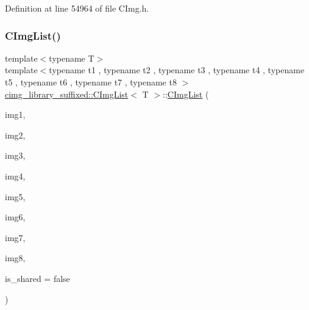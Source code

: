 Definition at line 54964 of file C\+Img.\+h.

\mbox{\label{structcimg__library__suffixed_1_1CImgList_a36b738a02037537b70dc5b18bc13705c}} 
\subsubsection{\texorpdfstring{C\+Img\+List()}{CImgList()}\hspace{0.1cm}{\footnotesize\ttfamily [15/19]}}
{\footnotesize\ttfamily template$<$typename T$>$ \\
template$<$typename t1 , typename t2 , typename t3 , typename t4 , typename t5 , typename t6 , typename t7 , typename t8 $>$ \\
\hyperlink{structcimg__library__suffixed_1_1CImgList}{cimg\+\_\+library\+\_\+suffixed\+::\+C\+Img\+List}$<$ T $>$\+::\hyperlink{structcimg__library__suffixed_1_1CImgList}{C\+Img\+List} (\begin{DoxyParamCaption}\item[{const \hyperlink{structcimg__library__suffixed_1_1CImg}{C\+Img}$<$ t1 $>$ \&}]{img1,  }\item[{const \hyperlink{structcimg__library__suffixed_1_1CImg}{C\+Img}$<$ t2 $>$ \&}]{img2,  }\item[{const \hyperlink{structcimg__library__suffixed_1_1CImg}{C\+Img}$<$ t3 $>$ \&}]{img3,  }\item[{const \hyperlink{structcimg__library__suffixed_1_1CImg}{C\+Img}$<$ t4 $>$ \&}]{img4,  }\item[{const \hyperlink{structcimg__library__suffixed_1_1CImg}{C\+Img}$<$ t5 $>$ \&}]{img5,  }\item[{const \hyperlink{structcimg__library__suffixed_1_1CImg}{C\+Img}$<$ t6 $>$ \&}]{img6,  }\item[{const \hyperlink{structcimg__library__suffixed_1_1CImg}{C\+Img}$<$ t7 $>$ \&}]{img7,  }\item[{const \hyperlink{structcimg__library__suffixed_1_1CImg}{C\+Img}$<$ t8 $>$ \&}]{img8,  }\item[{const bool}]{is\+\_\+shared = {\ttfamily false} }\end{DoxyParamCaption})\hspace{0.3cm}{\ttfamily [inline]}}



